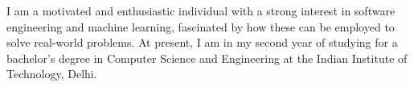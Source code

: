 

\begin{cvparagraph}
I am a motivated and enthusiastic individual with a strong interest in software engineering and machine learning, fascinated by how these can be employed to solve real-world problems. At present, I am in my second year of studying for a bachelor's degree in Computer Science and Engineering at the Indian Institute of Technology, Delhi.
\end{cvparagraph}
